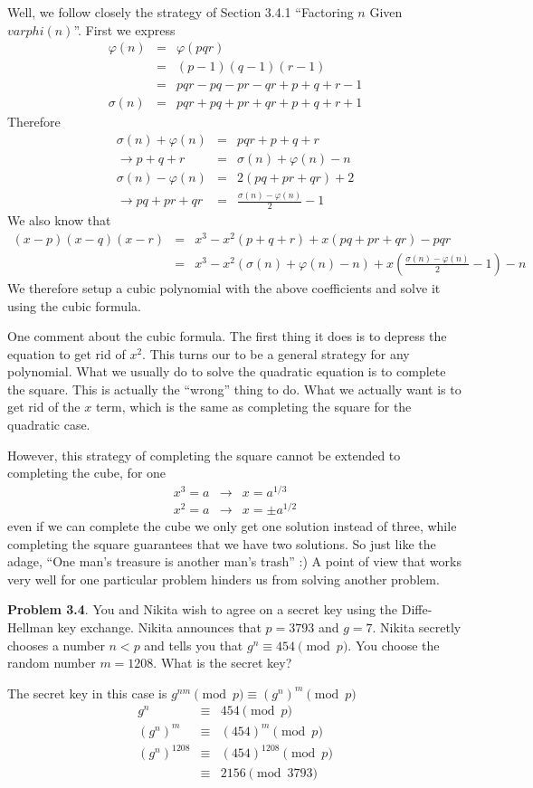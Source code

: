 \documentclass[aps,preprint,preprintnumbers,nofootinbib,showpacs,prd]{revtex4-1}
\newcommand{\nbea}{\begin{eqnarray*}}
\newcommand{\neea}{\end{eqnarray*}}
\begin{document}
Well, we follow closely the strategy of Section 3.4.1 ``Factoring $n$ Given $varphi(n)$''. First we express
%
\nbea
\varphi(n) & = & \varphi(pqr) \\
& = & (p-1)(q-1)(r-1) \\
& = & pqr - pq - pr - qr + p + q + r - 1\\
\sigma(n) & = & pqr + pq + pr + qr + p + q + r + 1
\neea
%
Therefore
%
\nbea
\sigma(n) + \varphi(n) & = & pqr + p + q + r \\
\to p + q + r & = & \sigma(n) + \varphi(n) - n \\
\sigma(n) - \varphi(n) & = & 2(pq + pr + qr) + 2 \\
\to pq + pr + qr & = & \frac{\sigma(n) - \varphi(n)}{2} - 1
\neea
%
We also know that
%
\nbea
(x - p)(x - q)(x - r) & = & x^3 - x^2(p + q + r) + x(pq + pr + qr) - pqr \\
& = &  x^3 - x^2(\sigma(n) + \varphi(n) - n) + x \left (\frac{\sigma(n) - \varphi(n)}{2} - 1 \right ) - n
\neea
%
We therefore setup a cubic polynomial with the above coefficients and solve it using the cubic formula.

One comment about the cubic formula. The first thing it does is to depress the equation to get rid of $x^2$. This turns our to be a general strategy for any polynomial. What we usually do to solve the quadratic equation is to complete the square. This is actually the ``wrong'' thing to do. What we actually want is to get rid of the $x$ term, which is the same as completing the square for the quadratic case.

However, this strategy of completing the square cannot be extended to completing the cube, for one
%
\nbea
x^3 = a & \to & x = a^{1/3} \\
x^2 = a & \to & x = \pm a^{1/2}
\neea
%
even if we can complete the cube we only get one solution instead of three, while completing the square guarantees that we have two solutions. So just like the adage, ``One man's treasure is another man's trash'' :) A point of view that works very well for one particular problem hinders us from solving another problem.

{\bf Problem 3.4}. You and Nikita wish to agree on a secret key using the Diffe-Hellman key exchange. Nikita announces that $p = 3793$ and $g = 7$. Nikita secretly chooses a number $n < p$ and tells you that $g^n \equiv 454 \pmod{p}$. You choose the random number $m = 1208$. What is the secret key?

The secret key in this case is $g^{nm} \pmod{p} \equiv (g^{n})^{m} \pmod{p}$
%
\nbea
g^n & \equiv & 454 \pmod{p} \\
(g^n)^m & \equiv & (454)^m \pmod{p} \\
(g^n)^{1208} & \equiv & (454)^{1208} \pmod{p} \\
& \equiv & 2156 \pmod{3793}
\neea
%
\end{document}
